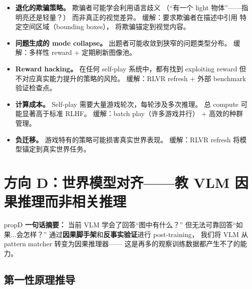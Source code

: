 \documentclass[12pt,a4paper]{article}
\begin{document}
\begin{riskbox}
\begin{itemize}[leftmargin=1.5em]
  \item \textbf{退化的欺骗策略。}
    欺骗者可能学会利用语言歧义
    （``有一个 light 物体''——指明亮还是轻量？）
    而非真正的视觉差异。
    缓解：要求欺骗者在描述中引用
    特定空间区域（bounding boxes），
    将欺骗锚定到视觉内容。
  \item \textbf{问题生成的 mode collapse。}
    出题者可能收敛到狭窄的问题类型分布。
    缓解：多样性 reward + 定期刷新图像池。
  \item \textbf{Reward hacking。}
    在任何 self-play 系统中，都有找到
    exploiting reward 但不对应真实能力提升的策略的风险。
    缓解：RLVR refresh + 外部 benchmark 验证检查点。
  \item \textbf{计算成本。}
    Self-play 需要大量游戏轮次，每轮涉及多次推理。
    总 compute 可能显著高于标准 RLHF。
    缓解：batch play（许多游戏并行）
    + 高效的种群管理。
  \item \textbf{负迁移。}
    游戏特有的策略可能损害真实世界表现。
    缓解：RLVR refresh 将模型锚定到真实世界任务。
\end{itemize}
\end{riskbox}


\newpage
\section{方向 D：世界模型对齐——教 VLM 因果推理而非相关推理}
\label{sec:propD}

\begin{proposalbox}{propD}
\textbf{一句话摘要：}
当前 VLM 学会了回答``图中有什么？''
但无法可靠回答``如果...会怎样？''
通过\textbf{因果脚手架}和\textbf{反事实验证}进行 post-training，
我们将 VLM 从 pattern matcher 转变为因果推理器——
这是再多的观察训练数据都产生不了的能力。
\end{proposalbox}

\subsection{第一性原理推导}
\end{document}
